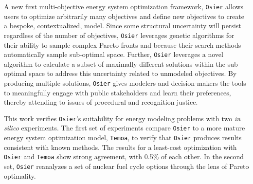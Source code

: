 A new first multi-objective energy system optimization framework, \texttt{Osier}
allows users to 
optimize arbitrarily many objectives and define new objectives to create a 
bespoke, contextualized, model. Since some structural 
uncertainty will persist regardless of the number of objectives, 
\texttt{Osier} leverages genetic algorithms for their ability to sample complex 
Pareto fronts and because their search methods automatically sample sub-optimal 
space. Further, \texttt{Osier} leverages a novel algorithm to calculate a subset of 
maximally different solutions within the sub-optimal space to address this 
uncertainty related to unmodeled objectives. By producing multiple solutions, 
\texttt{Osier} gives modelers and decision-makers the tools to meaningfully 
engage with public stakeholders and learn their preferences, thereby attending 
to issues of procedural and recognition justice.

This work verifies \texttt{Osier}'s suitability for energy modeling problems with two \textit{in silico} experiments. The first set of experiments
compare \texttt{Osier} to a more mature energy system optimization model, \texttt{Temoa}, to verify
that \texttt{Osier} produces results consistent with known methods. The results
for a least-cost optimization with \texttt{Osier} and \texttt{Temoa} show
strong agreement, with 0.5\% of each other. In the second set, \texttt{Osier}
reanalyzes a set of nuclear fuel cycle options through the lens of Pareto optimality.
